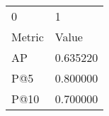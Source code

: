 \begin{tabular}{ll}
0 & 1 \\
Metric & Value \\
AP & 0.635220 \\
P@5 & 0.800000 \\
P@10 & 0.700000 \\
\end{tabular}
